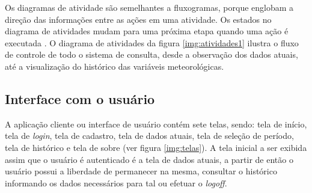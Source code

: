 Os diagramas de atividade são semelhantes a fluxogramas, porque englobam a direção das informações entre as ações em uma atividade. Os estados no diagrama de atividades mudam para uma próxima etapa quando uma ação é executada \cite{SITEDIAGATIV}.  O diagrama de atividades da figura \ref{img:atividades1} ilustra o fluxo de controle de todo o sistema de consulta, desde a observação dos dados atuais, até a visualização do histórico das variáveis meteorológicas.


\newpage

\subsection{Interface com o usuário} \label{subsec:interfaceComOUsurario}

A aplicação cliente ou interface de usuário contém sete telas, sendo: tela de início, tela de \textit{login}, tela de cadastro, tela de dados atuais, tela de seleção de período, tela de histórico e tela de sobre  (ver figura \ref{img:telas}). A tela inicial a ser exibida assim que o usuário é autenticado é a tela de dados atuais, a partir de então o usuário possui a liberdade de permanecer na mesma, consultar o histórico informando os dados necessários para tal ou efetuar o \textit{logoff}.

